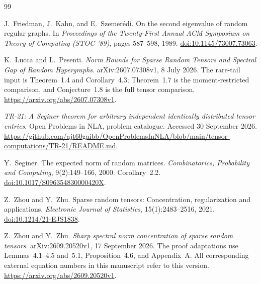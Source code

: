\documentclass[11pt]{article}
\theoremstyle{spaced}
\theoremstyle{remark}
\numberwithin{equation}{section}
\begin{document}
{}
\begin{thebibliography}{99}

J.~Friedman, J.~Kahn, and E.~Szemer\'edi.
\newblock On the second eigenvalue of random regular graphs.
\newblock In \emph{Proceedings of the Twenty-First Annual ACM Symposium
on Theory of Computing (STOC '89)}, pages 587--598, 1989.
\newblock \href{https://doi.org/10.1145/73007.73063}{doi:10.1145/73007.73063}.

K.~Lucca and L.~Pesenti.
\newblock \emph{Norm Bounds for Sparse Random Tensors and Spectral Gap
of Random Hypergraphs}.
\newblock arXiv:2607.07308v1, 8 July 2026.
\newblock The rare-tail input is Theorem~1.4 and Corollary~4.3;
Theorem~1.7 is the moment-restricted comparison, and Conjecture~1.8
is the full tensor comparison.
\newblock \url{https://arxiv.org/abs/2607.07308v1}.

\emph{TR-21: A Seginer theorem for arbitrary independent identically
distributed tensor entries}.
\newblock Open Problems in NLA, problem catalogue. Accessed 30 September 2026.
\newblock \url{https://github.com/ajt60gaibb/OpenProblemsInNLA/blob/main/tensor-computations/TR-21/README.md}.

Y.~Seginer.
\newblock The expected norm of random matrices.
\newblock \emph{Combinatorics, Probability and Computing},
9(2):149--166, 2000.
\newblock Corollary~2.2.
\newblock \href{https://doi.org/10.1017/S096354830000420X}{doi:10.1017/S096354830000420X}.

Z.~Zhou and Y.~Zhu.
\newblock Sparse random tensors: Concentration, regularization and applications.
\newblock \emph{Electronic Journal of Statistics}, 15(1):2483--2516, 2021.
\newblock \href{https://doi.org/10.1214/21-EJS1838}{doi:10.1214/21-EJS1838}.

Z.~Zhou and Y.~Zhu.
\newblock \emph{Sharp spectral norm concentration of sparse random tensors}.
\newblock arXiv:2609.20520v1, 17 September 2026.
\newblock The proof adaptations use Lemmas~4.1--4.5 and~5.1,
Proposition~4.6, and Appendix~A. All corresponding external equation
numbers in this manuscript refer to this version.
\newblock \url{https://arxiv.org/abs/2609.20520v1}.

\end{thebibliography}
\end{document}
